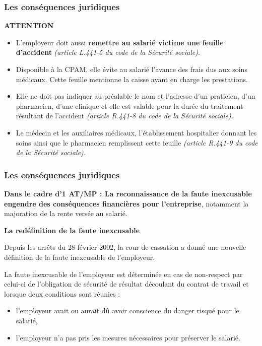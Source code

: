 \documentclass{beamer}
\begin{document}
\begin{frame}
\frametitle{Les conséquences juridiques }

\textbf{ATTENTION}
\begin{itemize}
\item L’employeur doit aussi \textbf{remettre au salarié victime une feuille d’accident} \textit{(article L.441-5 du code de la Sécurité sociale)}. 

\item Disponible à la CPAM, elle évite au salarié l’avance des frais dus aux soins médicaux. Cette feuille mentionne la caisse ayant en charge les prestations.

\item Elle ne doit pas indiquer au préalable le nom et l’adresse d’un praticien, d’un pharmacien, d’une clinique et elle est valable pour la durée du traitement résultant de l’accident \textit{(article R.441-8 du code de la Sécurité sociale). }

\item Le médecin et les auxiliaires médicaux, l’établissement hospitalier donnant les soins ainsi que le pharmacien remplissent cette feuille \textit{(article R.441-9 du code de la Sécurité sociale).}
\end{itemize}
\end{frame}

\begin{frame}
\frametitle{Les conséquences juridiques}

\textbf{Dans le cadre d'1 AT/MP : La reconnaissance de la faute inexcusable engendre des conséquences financières pour l’entreprise}, notamment la majoration de la rente versée au salarié.

\textbf{La redéfinition de la faute inexcusable}

Depuis les arrêts du 28 février 2002, la cour de cassation a donné une nouvelle définition de la faute inexcusable de l’employeur.

La faute inexcusable de l’employeur est déterminée en cas de non-respect par celui-ci de l’obligation de sécurité de résultat découlant du contrat de travail et lorsque deux conditions sont réunies : 
\begin{itemize}
\item l’employeur avait ou aurait dû avoir conscience du danger risqué pour le salarié, 
\item l’employeur n’a pas pris les mesures nécessaires pour préserver le salarié. 
\end{itemize}
\end{frame}
\end{document}
